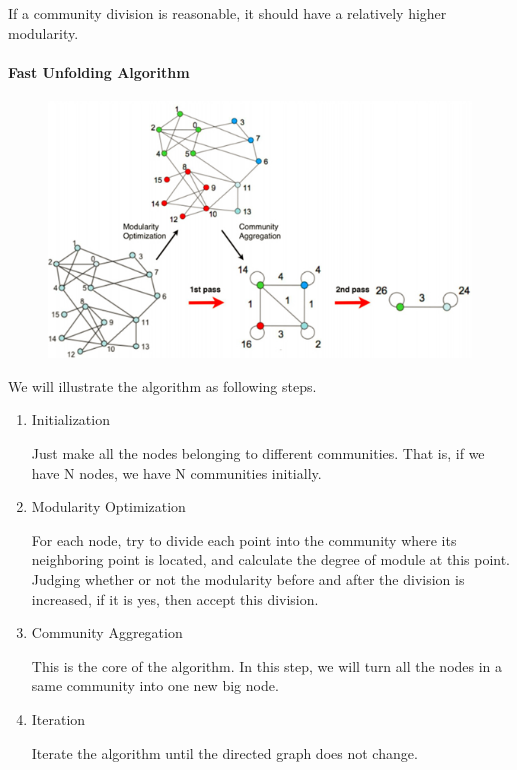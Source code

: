 \documentclass[11pt,a4paper]{article}
\begin{document}
If a community division is reasonable, it should have a relatively
higher modularity.

\hypertarget{header-n28}{%
\paragraph{Fast Unfolding Algorithm}\label{header-n28}}

\begin{figure}
\centering
\includegraphics[width = \columnwidth]{2.png}
\caption{}
\end{figure}

We will illustrate the algorithm as following steps.

\begin{enumerate}
\def\labelenumi{\arabic{enumi}.}
\item
  Initialization

  Just make all the nodes belonging to different communities. That is,
  if we have N nodes, we have N communities initially.
\item
  Modularity Optimization

  For each node, try to divide each point into the community where its
  neighboring point is located, and calculate the degree of module at
  this point. Judging whether or not the modularity before and after the
  division is increased, if it is yes, then accept this division.
\item
  Community Aggregation

  This is the core of the algorithm. In this step, we will turn all the
  nodes in a same community into one new big node.
\item
  Iteration

  Iterate the algorithm until the directed graph does not change.
\end{enumerate}
\end{document}
